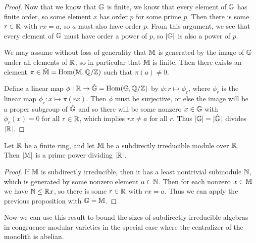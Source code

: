 \begin{appendices}
\begin{proof}
Now that we know that $\mathbb{G}$ is finite, we know that every element of $\mathbb{G}$ has finite order, so some element $x$ has order $p$ for some prime $p$. Then there is some $r \in \mathbb{R}$ with $rx = a$, so $a$ must also have order $p$. From this argument, we see that every element of $\mathbb{G}$ must have order a power of $p$, so $|\mathbb{G}|$ is also a power of $p$.%

We may assume without loss of generality that $\mathbb{M}$ is generated by the image of $\mathbb{G}$ under all elements of $\mathbb{R}$, so in particular that $\mathbb{M}$ is finite. Then there exists an element $\pi \in \hat{\mathbb{M}} = \operatorname{Hom}(\mathbb{M},\mathbb{Q}/\mathbb{Z})$ such that $\pi(a) \ne 0$.

Define a linear map $\phi : \mathbb{R} \rightarrow \hat{\mathbb{G}} = \operatorname{Hom}(\mathbb{G},\mathbb{Q}/\mathbb{Z})$ by $\phi : r \mapsto \phi_r$, where $\phi_r$ is the linear map $\phi_r: x \mapsto \pi(rx)$. Then $\phi$ must be surjective, or else the image will be a proper subgroup of $\hat{\mathbb{G}}$ and so there will be some nonzero $x \in \mathbb{G}$ with $\phi_r(x) = 0$ for all $r \in \mathbb{R}$, which implies $rx \ne a$ for all $r$. Thus $|\mathbb{G}| = |\hat{\mathbb{G}}|$ divides $|\mathbb{R}|$.
\end{proof}

\begin{cor} Let $\mathbb{R}$ be a finite ring, and let $\mathbb{M}$ be a subdirectly irreducible module over $\mathbb{R}$. Then $|\mathbb{M}|$ is a prime power dividing $|\mathbb{R}|$.
\end{cor}
\begin{proof} If $\mathbb{M}$ is subdirectly irreducible, then it has a least nontrivial submodule $\mathbb{N}$, which is generated by some nonzero element $a \in \mathbb{N}$. Then for each nonzero $x \in \mathbb{M}$ we have $\mathbb{N} \le \mathbb{R} x$, so there is some $r \in \mathbb{R}$ with $rx = a$. Thus we can apply the previous proposition with $\mathbb{G} = \mathbb{M}$.
\end{proof}

Now we can use this result to bound the sizes of subdirectly irreducible algebras in congruence modular varieties in the special case where the centralizer of the monolith is abelian.


\end{appendices}
